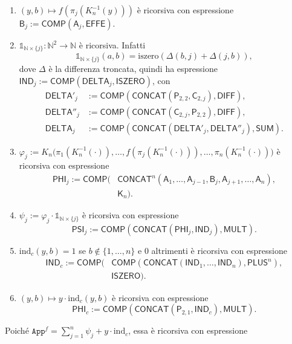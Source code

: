 \begin{sol}
\begin{enumerate}
\begin{enumerate}
\[
\mathsf A_j:=\mathsf{COMP}(\mathsf{COMP}(\mathsf P_{2,1},\mathsf{KINV}_n),\mathsf P_{n,j}).
\]
\item $(y,b)\mapsto f(\pi_j(K_n^{-1}(y)))$ è ricorsiva con espressione $\mathsf B_j:=\mathsf{COMP}(\mathsf A_j,\mathsf{EFFE})$.
\item $\mathbb 1_{\mathbb N\times\{j\}}:\mathbb N^2\to\mathbb N$ è ricorsiva. Infatti
\[
\mathbb 1_{\mathbb N\times\{j\}}(a,b)=\mathrm{iszero}(\Delta(b,j)+\Delta(j,b)),
\]
dove $\Delta$ è la differenza troncata, quindi ha espressione $\mathsf{IND}_j:=\mathsf{COMP}(\mathsf{DELTA}_j,\mathsf{ISZERO})$, con
\[
\begin{aligned}
\mathsf{DELTA}'_j&:=\mathsf{COMP}(\mathsf{CONCAT}(\mathsf P_{2,2},\mathsf C_{2,j}),\mathsf{DIFF}),\\
\mathsf{DELTA}''_j&:=\mathsf{COMP}(\mathsf{CONCAT}(\mathsf C_{2,j},\mathsf P_{2,2}),\mathsf{DIFF}),\\
\mathsf{DELTA}_j&:=\mathsf{COMP}(\mathsf{CONCAT}(\mathsf{DELTA}'_j,\mathsf{DELTA}''_j),\mathsf{SUM}).
\end{aligned}
\]
\item $\varphi_j:=K_n\big(\pi_1(K_n^{-1}(\cdot)),\dots,f(\pi_j(K_n^{-1}(\cdot))),\dots,\pi_n(K_n^{-1}(\cdot))\big)$ è ricorsiva con espressione
\[
\begin{aligned}
\mathsf{PHI}_j:=\mathsf{COMP}\big(&\mathsf{CONCAT}^n(\mathsf A_1,\dots,\mathsf A_{j-1},\mathsf B_j,\mathsf A_{j+1},\dots,\mathsf A_n),\\
&\mathsf K_n\big).
\end{aligned}
\]
\item $\psi_j:=\varphi_j\cdot\mathbb 1_{\mathbb N\times\{j\}}$ è ricorsiva con espressione
\[
\mathsf{PSI}_j:=\mathsf{COMP}(\mathsf{CONCAT}(\mathsf{PHI}_j,\mathsf{IND}_j),\mathsf{MULT}).
\]
\item $\mathrm{ind}_c(y,b)=1$ se $b\notin\{1,\dots,n\}$ e $0$ altrimenti è ricorsiva con espressione
\[
\begin{aligned}
\mathsf{IND}_c:=\mathsf{COMP}\big(&\mathsf{COMP}(\mathsf{CONCAT}(\mathsf{IND}_1,\dots,\mathsf{IND}_n),\mathsf{PLUS}^n),\\
&\mathsf{ISZERO}\big).
\end{aligned}
\]
\item $(y,b)\mapsto y\cdot\mathrm{ind}_c(y,b)$ è ricorsiva con espressione
\[
\mathsf{PHI}_c:=\mathsf{COMP}(\mathsf{CONCAT}(\mathsf P_{2,1},\mathsf{IND}_c),\mathsf{MULT}).
\]
\end{enumerate}
Poiché $\texttt{App}^f=\sum_{j=1}^n\psi_j+y\cdot\mathrm{ind}_c$, essa è ricorsiva con espressione

\end{enumerate}
\end{sol}
